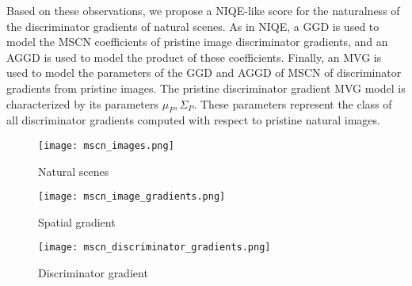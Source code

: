 \documentclass{article}
\begin{document}
Based on these observations, we propose a NIQE-like score for the naturalness of the discriminator gradients of natural scenes. As in NIQE, a GGD is used to model the MSCN coefficients of pristine image discriminator gradients, and an AGGD is used to model the product of these coefficients. Finally, an MVG is used to model the parameters of the GGD and AGGD of MSCN of discriminator gradients from pristine images. The pristine discriminator gradient MVG model is characterized by its parameters $\mu_P, \Sigma_P$. These parameters represent the class of all discriminator gradients computed with respect to pristine natural images.
\begin{figure*}[htbp]
\centering
\begin{subfigure}[b]{0.32\textwidth}
\texttt{[image: mscn\_images.png]}
\caption{Natural scenes}
\label{subfig:ns}
\end{subfigure}
\begin{subfigure}[b]{0.32\textwidth}
\texttt{[image: mscn\_image\_gradients.png]}
\caption{Spatial gradient}
\label{subfig:nsg}
\end{subfigure}
\begin{subfigure}[b]{0.32\textwidth}
\texttt{[image: mscn\_discriminator\_gradients.png]}
\caption{Discriminator gradient}
\label{subfig:dg}
\end{subfigure}
\caption{The empirical histograms of MSCN coefficients. (\ref{subfig:ns}) Pristine natural scenes and their distorted versions. (\ref{subfig:nsg}) Spatial gradient of pristine natural scenes and their distorted versions. (\ref{subfig:dg}) Discriminator gradient of pristine natural scenes and their distorted versions.}
\label{fig:nss_grad}
\end{figure*}
\end{document}

